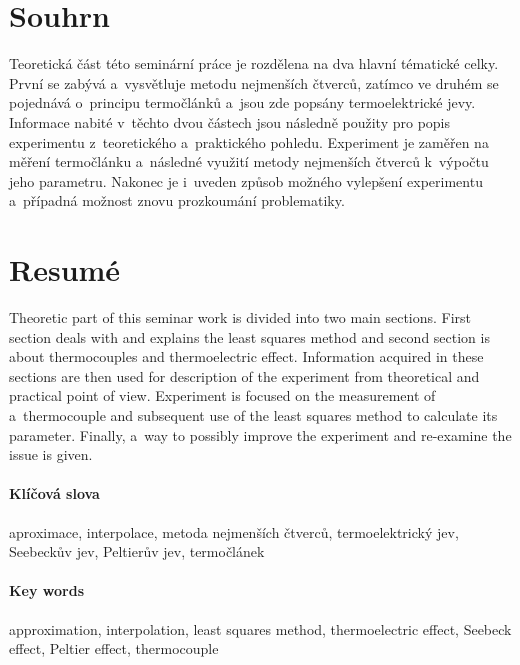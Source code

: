 \section[Souhrn (Resumé)]{Souhrn}
Teoretická část této seminární práce je rozdělena na dva hlavní tématické
celky.  První se zabývá a~vysvětluje metodu nejmenších čtverců, zatímco ve
druhém se pojednává o~principu termočlánků a~jsou zde popsány termoelektrické
jevy. Informace nabité v~těchto dvou částech jsou následně použity pro popis
experimentu z~teoretického a~praktického pohledu. Experiment je zaměřen na
měření termočlánku a~následné využití metody nejmenších čtverců k~výpočtu jeho
parametru. Nakonec je i~uveden způsob možného vylepšení experimentu a~případná
možnost znovu prozkoumání problematiky.

\section*{Resumé}
Theoretic part of this seminar work is divided into two main sections. First
section deals with and explains the least squares method and second section is
about thermocouples and thermoelectric effect. Information acquired in these
sections are then used for description of the experiment from theoretical and
practical point of view. Experiment is focused on the measurement of
a~thermocouple and subsequent use of the least squares method to calculate its
parameter. Finally, a~way to possibly improve the experiment and re-examine the
issue is given.



\paragraph{Klíčová slova}
aproximace, interpolace, metoda nejmenších čtverců, termoelektrický jev, 
Seebeckův jev, Peltierův jev, termočlánek

\paragraph{Key words}
approximation, interpolation, least squares method, thermoelectric effect, 
Seebeck effect, Peltier effect, thermocouple

